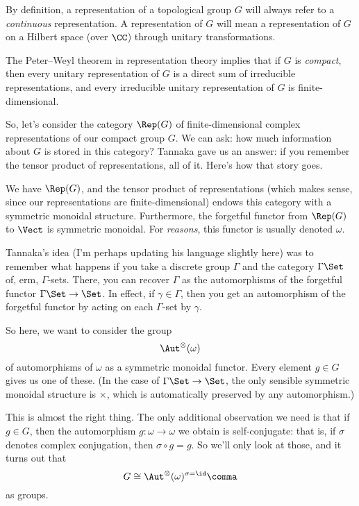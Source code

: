 \documentclass[leqno]{article}
\begin{document}
By definition, a representation of a topological group \(G\) will
always refer to a \emph{continuous} representation.
A  representation of \(G\) will mean a representation
of \(G\) on a Hilbert space (over \(\CC\))
through unitary transformations.

The Peter--Weyl theorem in representation theory implies that
if \(G\) is \emph{compact}, then
every unitary representation of \(G\) is a direct sum
of irreducible representations,
and every irreducible unitary representation of \(G\) is
finite-dimensional.

So, let's consider the category \(\Rep(G)\) of
finite-dimensional complex representations
of our compact group \(G\).
We can ask:
how much information about \(G\) is stored in this category?
Tannaka gave us an answer:
if you remember the tensor product of representations, all of it.
Here's how that story goes.

We have \(\Rep(G)\), and the tensor product of representations
(which makes sense, since our representations are finite-dimensional)
endows this category with a symmetric monoidal structure.
Furthermore, the forgetful functor from \(\Rep(G)\) to \(\Vect\)
is symmetric monoidal.
For \emph{reasons}, this functor is usually denoted \(\omega\).

Tannaka's idea (I'm perhaps updating his language slightly here)
was to remember what happens if you take a discrete group \(\Gamma\)
and the category \(\Gamma\Set\) of, erm, \(\Gamma\)-sets.
There, you can recover \(\Gamma\) as the automorphisms
of the forgetful functor \(\Gamma\Set \to \Set\).
In effect, if \(\gamma \in \Gamma\), then
you get an automorphism of the forgetful functor
by acting on each \(\Gamma\)-set by \(\gamma\).

So here, we want to consider the group
\begin{equation*}
    \Aut^{\otimes}(\omega)
\end{equation*}
of automorphisms of \(\omega\) as a symmetric monoidal functor.
Every element \(g \in G\) gives us one of these.
(In the case of \(\Gamma\Set \to \Set\),
the only sensible symmetric monoidal structure is \(\times\),
which is automatically preserved by any automorphism.)

This is almost the right thing.
The only additional observation we need is that
if \(g \in G\), then the automorphism \(g \colon \omega \to \omega\)
we obtain is self-conjugate:
that is, if \(\sigma\) denotes complex conjugation, then
\(\sigma \circ g = g\).
So we'll only look at those, and it turns out that
\begin{equation*}
    G \cong \Aut^{\otimes}(\omega)^{\sigma=\id} \comma
\end{equation*}
as groups.
\end{document}
